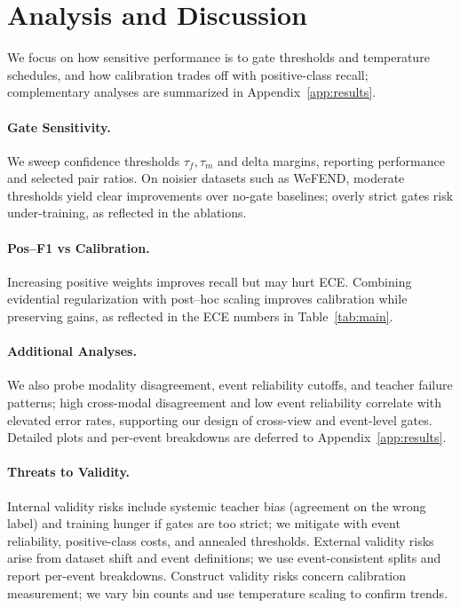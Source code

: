 \section{Analysis and Discussion}
\label{sec:analysis}
We focus on how sensitive performance is to gate thresholds and temperature schedules, and how calibration trades off with positive-class recall; complementary analyses are summarized in Appendix~\ref{app:results}.

\paragraph{Gate Sensitivity.} We sweep confidence thresholds \(\tau_f,\tau_m\) and delta margins, reporting performance and selected pair ratios. On noisier datasets such as WeFEND, moderate thresholds yield clear improvements over no-gate baselines; overly strict gates risk under-training, as reflected in the ablations.

\paragraph{Pos–F1 vs Calibration.} Increasing positive weights improves recall but may hurt ECE. Combining evidential regularization with post–hoc scaling improves calibration while preserving gains, as reflected in the ECE numbers in Table~\ref{tab:main}.

\paragraph{Additional Analyses.} We also probe modality disagreement, event reliability cutoffs, and teacher failure patterns; high cross-modal disagreement and low event reliability correlate with elevated error rates, supporting our design of cross-view and event-level gates. Detailed plots and per-event breakdowns are deferred to Appendix~\ref{app:results}.

\paragraph{Threats to Validity.} Internal validity risks include systemic teacher bias (agreement on the wrong label) and training hunger if gates are too strict; we mitigate with event reliability, positive-class costs, and annealed thresholds. External validity risks arise from dataset shift and event definitions; we use event-consistent splits and report per-event breakdowns. Construct validity risks concern calibration measurement; we vary bin counts and use temperature scaling to confirm trends.
